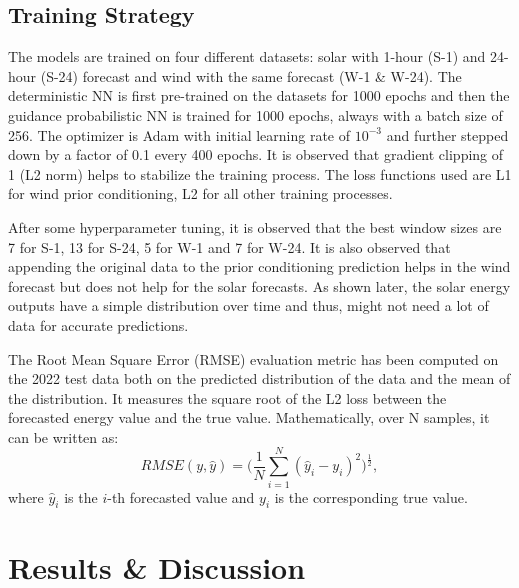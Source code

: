 \documentclass{article}
\begin{document}
\subsection{Training Strategy}

The models are trained on four different datasets: solar with 1-hour (S-1) and 24-hour (S-24) forecast and wind with the same forecast (W-1 \& W-24). The deterministic NN is first pre-trained on the datasets for 1000 epochs and then the guidance probabilistic NN is trained for 1000 epochs, always with a batch size of 256. The optimizer is Adam with initial learning rate of $10^{-3}$ and further stepped down by a factor of 0.1 every 400 epochs. It is observed that gradient clipping of 1 (L2 norm) helps to stabilize the training process. The loss functions used are L1 for wind prior conditioning, L2 for all other training processes. 

After some hyperparameter tuning, it is observed that the best window sizes are 7 for S-1, 13 for S-24, 5 for W-1 and 7 for W-24. It is also observed that appending the original data to the prior conditioning prediction helps in the wind forecast but does not help for the solar forecasts. As shown later, the solar energy outputs have a simple distribution over time and thus, might not need a lot of data for accurate predictions.

The Root Mean Square Error (RMSE) evaluation metric has been computed on the 2022 test data both on the predicted distribution of the data and the mean of the distribution. It measures the square root of the L2 loss between the forecasted energy value and the true value. Mathematically, over N samples, it can be written as:
\begin{equation}
  RMSE(y, \hat{y}) = \biggl(\frac{1}{N}\sum_{i=1}^{N}(\hat{y}_i - y_i)^2\biggl)^{\frac{1}{2}},
\end{equation}
where $\hat{y}_i$ is the $i$-th forecasted value and $y_i$ is the corresponding true value.

\section{Results \& Discussion}
\end{document}
